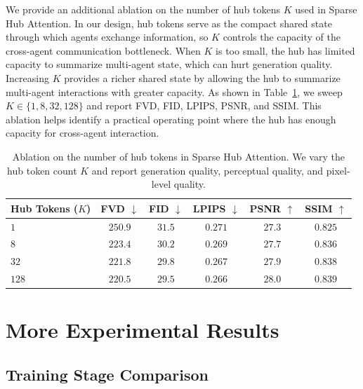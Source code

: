 \documentclass{llmxive}
\providecommand{\arraystretch}{1.12}
\begin{document}
We provide an additional ablation on the number of hub tokens $K$ used in Sparse Hub Attention.
In our design, hub tokens serve as the compact shared state through which agents exchange information, so $K$ controls the capacity of the cross-agent communication bottleneck.
When $K$ is too small, the hub has limited capacity to summarize multi-agent state, which can hurt generation quality.
Increasing $K$ provides a richer shared state by allowing the hub to summarize multi-agent interactions with greater capacity.
As shown in Table~\ref{tab:hub-token-ablation}, we sweep $K\in\{1,8,32,128\}$ and report FVD, FID, LPIPS, PSNR, and SSIM.
This ablation helps identify a practical operating point where the hub has enough capacity for cross-agent interaction.

\begin{table}[t]
  \centering
  \footnotesize
%
  \label{tab:hub-token-ablation}%
  \vspace{4pt}%
  \setlength{\tabcolsep}{4pt}%
  \renewcommand{\arraystretch}{1.12}%
    \begin{tabular}{@{}lccccc@{}}
    \toprule
    \textbf{Hub Tokens ($K$)}
      & FVD $\downarrow$
      & FID $\downarrow$
      & LPIPS $\downarrow$
      & PSNR $\uparrow$
      & SSIM $\uparrow$ \\
    \midrule
    $1$
      & $250.9$ & $31.5$ & $0.271$ & $27.3$ & $0.825$ \\
    $8$
      & $223.4$ & $30.2$ & $0.269$ & $27.7$ & $0.836$ \\
    $32$
      & $221.8$ & $29.8$ & $0.267$ & $27.9$ & $0.838$ \\
    $128$
      & $220.5$ & $29.5$ & $0.266$ & $28.0$ & $0.839$ \\
    \bottomrule
  \end{tabular}
\caption{Ablation on the number of hub tokens in Sparse Hub Attention. We vary the hub token count $K$ and report generation quality, perceptual quality, and pixel-level quality.}
\end{table}


\section{More Experimental Results}
\label{app:more-experimental-results}

\subsection{Training Stage Comparison}
\label{app:training-stage-comparison}
\end{document}
